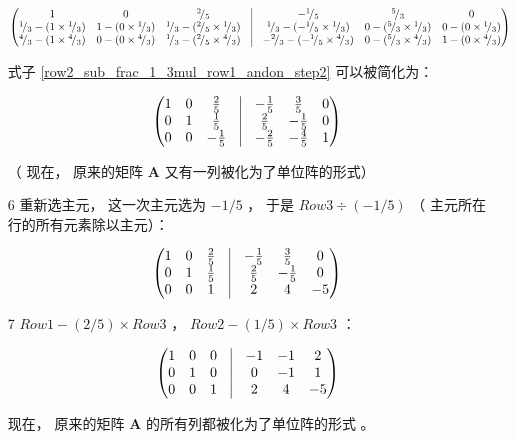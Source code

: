 \documentclass[a4paper, 8pt]{article}
\newcommand{\matr}[1]{\mathbf{#1}}
\newcommand*\rfrac[2]{{}^{#1}\!/_{#2}}
\begin{document}
\begin{itemize}
\begin{equation} \label{row2_sub_frac_1_3mul_row1_andon_step2}
\begin{pmatrix}
1 & 0 & \rfrac{2}{5} & \vline & -\rfrac{1}{5} & \rfrac{5}{3} & 0 \\
\rfrac{1}{3}-(1\times\rfrac{1}{3}) & 1-(0\times\rfrac{1}{3}) & \rfrac{1}{3}-(\rfrac{2}{5}\times\rfrac{1}{3}) & \vline & \rfrac{1}{3}-(-\rfrac{1}{5}\times\rfrac{1}{3}) &0-(\rfrac{5}{3}\times\rfrac{1}{3})&0-(0\times\rfrac{1}{3}) \\
\rfrac{4}{3}-(1\times\rfrac{4}{3}) & 0-(0\times\rfrac{4}{3}) & \rfrac{1}{3}-(\rfrac{2}{5}\times\rfrac{4}{3}) & \vline & -\rfrac{2}{3}-(-\rfrac{1}{5}\times\rfrac{4}{3}) & 0-(\rfrac{5}{3}\times\rfrac{4}{3}) & 1-(0\times\rfrac{4}{3})
\end{pmatrix}
\end{equation}

式子 \ref{row2_sub_frac_1_3mul_row1_andon_step2} 可以被简化为：

\begin{equation} \label{row2_sub_frac_1_3mul_row1_andon_result}
\begin{pmatrix}
1&0&\frac{2}{5} &\vline& -\frac{1}{5} & \frac{3}{5} & 0 \\
0&1&\frac{1}{5} &\vline& \frac{2}{5} & -\frac{1}{5} & 0  \\
0&0&-\frac{1}{5} &\vline& -\frac{2}{5} & -\frac{4}{5} & 1
\end{pmatrix}
\end{equation}


（ 现在， 原来的矩阵 $\matr{A}$ 又有一列被化为了单位阵的形式）

\item[6] 重新选主元， 这一次主元选为 $-1/5$ ， 于是 $Row3 \div (-1/5)$ （ 主元所在行的所有元素除以主元）：

\begin{equation}
\begin{pmatrix}
1&0&\frac{2}{5} &\vline& -\frac{1}{5} & \frac{3}{5} & 0 \\
0&1&\frac{1}{5} &\vline& \frac{2}{5} & -\frac{1}{5} & 0  \\
0&0&1 &\vline& 2 & 4 & -5
\end{pmatrix}
\end{equation}

\item[7] $Row1 - (2/5) \times Row3$ ， $Row2 - (1/5) \times Row3$ ：

\begin{equation}
\begin{pmatrix}
1&0&0 &\vline& -1 & -1 & 2 \\
0&1&0 &\vline& 0 & -1 & 1  \\
0&0&1 &\vline& 2 & 4 & -5
\end{pmatrix}
\end{equation}

现在， 原来的矩阵 $\matr{A}$ 的所有列都被化为了单位阵的形式 。

\end{itemize}
\end{document}
